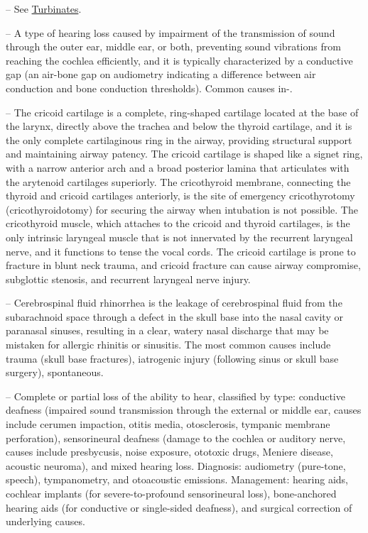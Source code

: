 -- See \hyperlink{Turbinates}{Turbinates}.

-- A type of hearing loss caused by impairment of the transmission of sound through the outer ear, middle ear, or both, preventing sound vibrations from reaching the cochlea efficiently, and it is typically characterized by a conductive gap (an air-bone gap on audiometry indicating a difference between air conduction and bone conduction thresholds). Common causes in-.

-- The cricoid cartilage is a complete, ring-shaped cartilage located at the base of the larynx, directly above the trachea and below the thyroid cartilage, and it is the only complete cartilaginous ring in the airway, providing structural support and maintaining airway patency. The cricoid cartilage is shaped like a signet ring, with a narrow anterior arch and a broad posterior lamina that articulates with the arytenoid cartilages superiorly. The cricothyroid membrane, connecting the thyroid and cricoid cartilages anteriorly, is the site of emergency cricothyrotomy (cricothyroidotomy) for securing the airway when intubation is not possible. The cricothyroid muscle, which attaches to the cricoid and thyroid cartilages, is the only intrinsic laryngeal muscle that is not innervated by the recurrent laryngeal nerve, and it functions to tense the vocal cords. The cricoid cartilage is prone to fracture in blunt neck trauma, and cricoid fracture can cause airway compromise, subglottic stenosis, and recurrent laryngeal nerve injury.

-- Cerebrospinal fluid rhinorrhea is the leakage of cerebrospinal fluid from the subarachnoid space through a defect in the skull base into the nasal cavity or paranasal sinuses, resulting in a clear, watery nasal discharge that may be mistaken for allergic rhinitis or sinusitis. The most common causes include trauma (skull base fractures), iatrogenic injury (following sinus or skull base surgery), spontaneous.

-- Complete or partial loss of the ability to hear, classified by type: conductive deafness (impaired sound transmission through the external or middle ear, causes include cerumen impaction, otitis media, otosclerosis, tympanic membrane perforation), sensorineural deafness (damage to the cochlea or auditory nerve, causes include presbycusis, noise exposure, ototoxic drugs, Meniere disease, acoustic neuroma), and mixed hearing loss. Diagnosis: audiometry (pure-tone, speech), tympanometry, and otoacoustic emissions. Management: hearing aids, cochlear implants (for severe-to-profound sensorineural loss), bone-anchored hearing aids (for conductive or single-sided deafness), and surgical correction of underlying causes.

